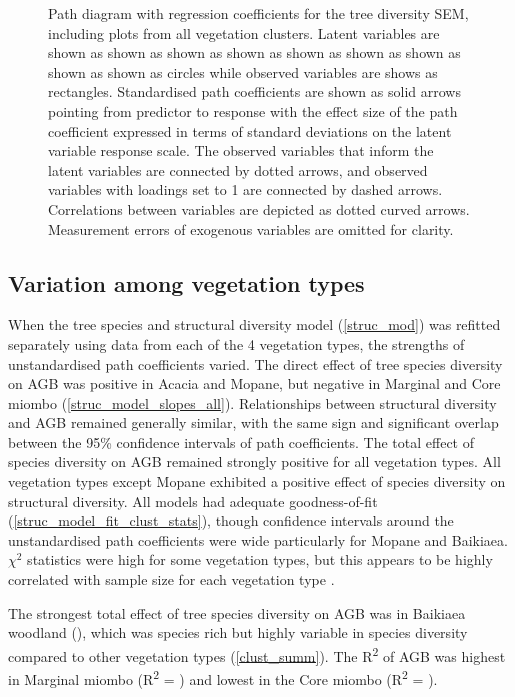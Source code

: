 \documentclass[11pt,a4paper]{article}
\begin{document}
\begin{figure}[H]
\centering
	
	\caption{Path diagram with regression coefficients for the tree diversity SEM, including plots from all vegetation clusters. Latent variables are shown as shown as shown as shown as shown as shown as shown as shown as shown as circles while observed variables are shows as rectangles. Standardised path coefficients are shown as solid arrows pointing from predictor to response with the effect size of the path coefficient expressed in terms of standard deviations on the latent variable response scale. The observed variables that inform the latent variables are connected by dotted arrows, and observed variables with loadings set to 1 are connected by dashed arrows. Correlations between variables are depicted as dotted curved arrows. Measurement errors of exogenous variables are omitted for clarity.}
	\label{struc_mod}
\end{figure}

\subsection{Variation among vegetation types}

When the tree species and structural diversity model (\autoref{struc_mod}) was refitted separately using data from each of the 4 vegetation types, the strengths of unstandardised path coefficients varied. The direct effect of tree species diversity on AGB was positive in Acacia and Mopane, but negative in Marginal and Core miombo (\autoref{struc_model_slopes_all}). Relationships between structural diversity and AGB remained generally similar, with the same sign and significant overlap between the 95\% confidence intervals of path coefficients. The total effect of species diversity on AGB remained strongly positive for all vegetation types. All vegetation types except Mopane exhibited a positive effect of species diversity on structural diversity. All models had adequate goodness-of-fit (\autoref{struc_model_fit_clust_stats}), though confidence intervals around the unstandardised path coefficients were wide particularly for Mopane and Baikiaea. $\chi^{2}$ statistics were high for some vegetation types, but this appears to be highly correlated with sample size for each vegetation type \citep{Hooper2008}.

The strongest total effect of tree species diversity on AGB was in Baikiaea woodland (\struccsb{}), which was species rich but highly variable in species diversity compared to other vegetation types (\autoref{clust_summ}). The R\textsuperscript{2} of AGB was highest in Marginal miombo (R\textsuperscript{2} = \strucarsq{}) and lowest in the Core miombo (R\textsuperscript{2} = \strucbrsq{}).
\end{document}
